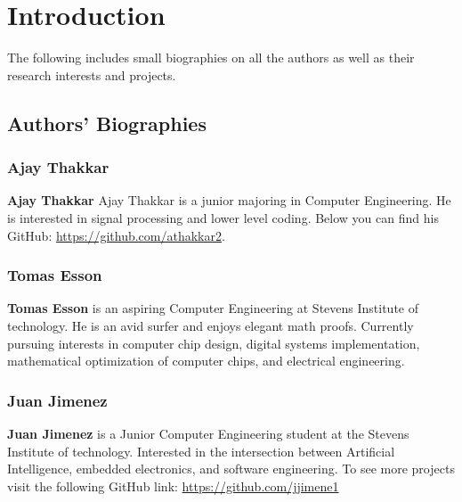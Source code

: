 \chapter{Introduction 
\label{Introduction}}

The following includes small biographies on all the authors as well as their research interests and projects.

\section*{Authors' Biographies}
\subsection*{Ajay Thakkar}
\textbf{Ajay Thakkar} Ajay Thakkar is a junior majoring in Computer Engineering. He is interested in signal processing and lower level coding. Below you can find his GitHub: \url{https://github.com/athakkar2}.

\subsection*{Tomas Esson}
\textbf{Tomas Esson} is an aspiring Computer Engineering at Stevens Institute of technology. He is an avid surfer and enjoys elegant math proofs. Currently pursuing interests in computer chip design, digital systems implementation, mathematical optimization of computer chips, and electrical engineering. 

\subsection*{Juan Jimenez}
\textbf{Juan Jimenez} is a Junior Computer Engineering student at the Stevens Institute of technology. Interested in the intersection between Artificial Intelligence, embedded electronics, and software engineering. To see more projects visit the following GitHub link: \url{https://github.com/jjimene1}  